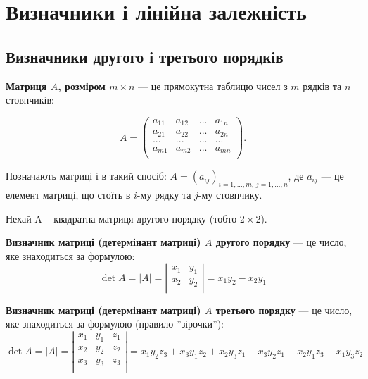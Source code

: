 \chapter{Визначники і лінійна залежність}


\section{Визначники другого і третього порядків}

\begin{definition}
	\textbf{Матриця $A$, розміром $m \times n$} --- це прямокутна таблицю чисел з
	$m$ рядків та $n$ стовпчиків:
	
	$$A = \begin{pmatrix}
		a_{11}	& a_{12}	& ...	& a_{1n}  \\
		a_{21}	& a_{22}	& ...	& a_{2n}  \\
		...		& ...		& ...	& ...     \\
		a_{m1}	& a_{m2}	& ...	& a_{mn}  \\
	\end{pmatrix}.$$
\end{definition}

Позначають матриці і в такий спосіб: $A = (a_{ij})_{i=1, ..., m,\, j=1, ..., n}$, де $a_{ij}$ --- це елемент
матриці, що стоїть в $i$-му рядку та $j$-му стовпчику.

Нехай A – квадратна матриця другого порядку (тобто $2 \times 2$).

\begin{definition}
	\textbf{Визначник матриці (детермінант матриці) $A$ другого порядку} --- це число, яке знаходиться за формулою:
	$$\det A = |A| = \left| \begin{matrix}
		x_1 & y_1 \\
		x_2 & y_2 \\
	\end{matrix} \right| = x_1y_2 - x_2y_1$$
\end{definition}

\begin{definition}
	\textbf{Визначник матриці (детермінант матриці) $A$ третього порядку} ---  це число, яке знаходиться за формулою (правило ''зірочки''): 
	$$\det A = |A| = \left| \begin{matrix}
		x_1 & y_1 & z_1 \\
		x_2 & y_2 & z_2 \\
		x_3 & y_3 & z_3 \\
	\end{matrix} \right| = x_1y_2z_3 + x_3y_1z_2 + x_2y_3z_1 - x_3y_2z_1 - x_2y_1z_3 - x_1y_3z_2$$
\end{definition}

